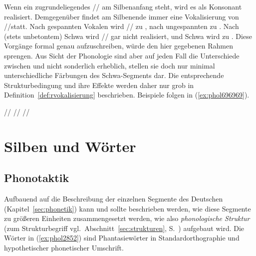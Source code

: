 Wenn ein zugrundeliegendes // am Silbenanfang steht, wird es als Konsonant \textipa{[K]} realisiert.
Demgegenüber findet am Silbenende immer eine Vokalisierung von //statt.
Nach gespannten Vokalen wird // zu \textipa{[5]}, nach ungespannten zu \textipa{[@]}.
Nach (stets unbetontem) Schwa wird // gar nicht realisiert, und Schwa wird zu \textipa{[5]}.
Diese Vorgänge formal genau aufzuschreiben, würde den hier gegebenen Rahmen sprengen.
Aus Sicht der Phonologie sind aber auf jeden Fall die Unterschiede zwischen \textipa{[@]} und \textipa{[5]} nicht sonderlich erheblich, stellen sie doch nur minimal unterschiedliche Färbungen des Schwa-Segments dar.
Die entsprechende Strukturbedingung und ihre Effekte werden daher nur grob in Definition~\ref{def:rvokalisierung} beschrieben.
Beispiele folgen in (\ref{ex:phol696969}).


\begin{exe}
  \ex \label{ex:phol696969}
  \begin{xlist}
  	\ex /\textipa{[g@KIN@K]}/ \phopro \textipa{[g@.KIN.5]}
  	\ex /\textipa{[bEK]}/ \phopro \textipa{[b\t{E5}]}
  	\ex /\textipa{[knaK]}/ \phopro \textipa{[kn\t{a@}]}
  \end{xlist}
\end{exe}







\section{Silben und Wörter}

\label{sec:phonotaktik}

\subsection{Phonotaktik}

Aufbauend auf die Beschreibung der einzelnen Segmente des Deutschen (Kapitel~\ref{sec:phonetik}) kann und sollte beschrieben werden, wie diese Segmente zu größeren Einheiten zusammengesetzt werden, wie also \textit{phonologische Struktur} (zum Strukturbegriff vgl.\ Abschnitt~\ref{sec:strukturen}, S.~\pageref{sec:strukturen}) aufgebaut wird.
Die Wörter in (\ref{ex:phol2852}) sind Phantasiewörter in Standardorthographie und hypothetischer phonetischer Umschrift.

